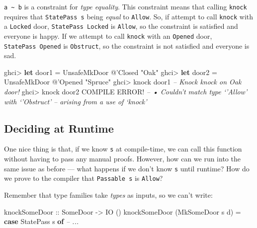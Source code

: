 \documentclass[]{article}
\newenvironment{Shaded}{}{}
\newcommand{\CommentTok}[1]{\textcolor[rgb]{0.38,0.63,0.69}{\textit{#1}}}
\newcommand{\DataTypeTok}[1]{\textcolor[rgb]{0.56,0.13,0.00}{#1}}
\newcommand{\FunctionTok}[1]{\textcolor[rgb]{0.02,0.16,0.49}{#1}}
\newcommand{\KeywordTok}[1]{\textcolor[rgb]{0.00,0.44,0.13}{\textbf{#1}}}
\newcommand{\NormalTok}[1]{#1}
\newcommand{\OtherTok}[1]{\textcolor[rgb]{0.00,0.44,0.13}{#1}}
\newcommand{\StringTok}[1]{\textcolor[rgb]{0.25,0.44,0.63}{#1}}
\begin{document}
\texttt{a\ \textasciitilde{}\ b} is a constraint for \emph{type equality}. This
constraint means that calling \texttt{knock} requires that \texttt{StatePass\ s}
being \emph{equal} to \texttt{\textquotesingle{}Allow}. So, if attempt to call
\texttt{knock} with a \texttt{\textquotesingle{}Locked} door,
\texttt{StatePass\ \textquotesingle{}Locked} is
\texttt{\textquotesingle{}Allow}, so the constraint is satisfied and everyone is
happy. If we attempt to call \texttt{knock} with an
\texttt{\textquotesingle{}Opened} door,
\texttt{StatePass\ \textquotesingle{}Opened} is
\texttt{\textquotesingle{}Obstruct}, so the constraint is not satisfied and
everyone is sad.

\begin{Shaded}
\begin{Highlighting}[]
\NormalTok{ghci}\FunctionTok{>} \KeywordTok{let}\NormalTok{ door1 }\FunctionTok{=} \DataTypeTok{UnsafeMkDoor} \FunctionTok{@}\NormalTok{'}\DataTypeTok{Closed} \StringTok{"Oak"}
\NormalTok{ghci}\FunctionTok{>} \KeywordTok{let}\NormalTok{ door2 }\FunctionTok{=} \DataTypeTok{UnsafeMkDoor} \FunctionTok{@}\NormalTok{'}\DataTypeTok{Opened} \StringTok{"Spruce"}
\NormalTok{ghci}\FunctionTok{>}\NormalTok{ knock door1}
\CommentTok{-- Knock knock on Oak door!}
\NormalTok{ghci}\FunctionTok{>}\NormalTok{ knock door2}
\DataTypeTok{COMPILE} \DataTypeTok{ERROR}\FunctionTok{!}
\CommentTok{--     • Couldn't match type ‘'Allow’ with ‘'Obstruct’}
\CommentTok{--             arising from a use of ‘knock’}
\end{Highlighting}
\end{Shaded}

\hypertarget{deciding-at-runtime}{%
\subsection{Deciding at Runtime}\label{deciding-at-runtime}}

One nice thing is that, if we know \texttt{s} at compile-time, we can call this
function without having to pass any manual proofs. However, how can we run into
the same issue as before --- what happens if we don't know \texttt{s} until
runtime? How do we prove to the compiler that \texttt{Passable\ s} is
\texttt{\textquotesingle{}Allow}?

Remember that type families take \emph{types} as inputs, so we can't write:

\begin{Shaded}
\begin{Highlighting}[]
\OtherTok{knockSomeDoor ::} \DataTypeTok{SomeDoor} \OtherTok{->} \DataTypeTok{IO}\NormalTok{ ()}
\NormalTok{knockSomeDoor (}\DataTypeTok{MkSomeDoor}\NormalTok{ s d) }\FunctionTok{=}
    \KeywordTok{case} \DataTypeTok{StatePass}\NormalTok{ s }\KeywordTok{of}
      \CommentTok{-- ...}
\end{Highlighting}
\end{Shaded}
\end{document}
